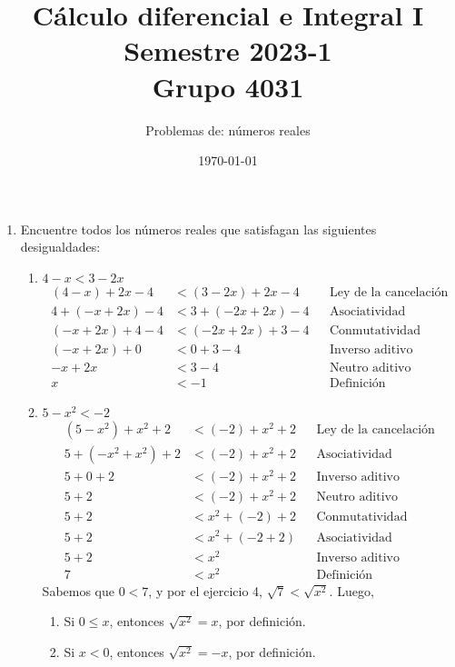 \documentclass[11pt]{article}
\begin{document}
\title{\vspace{-2cm}Cálculo diferencial e Integral I \\ Semestre 2023-1 \\ Grupo 4031}
\author{Problemas de: números reales \\ }
\date{\today}
\maketitle
\thispagestyle{empty}

\begin{enumerate}
 \item Encuentre todos los números reales que satisfagan las siguientes desigualdades: \begin{enumerate}[label=(\alph*)]
  \item $4-x<3-2x$
  \begin{align*}
   (4-x)+2x-4&< (3-2x)+2x-4 && \text{Ley de la cancelación}\\
   4+(-x+2x)-4 &< 3+(-2x+2x)-4 && \text{Asociatividad}\\
   (-x+2x)+4-4 &< (-2x+2x)+3-4 && \text{Conmutatividad}\\
   (-x+2x)+0 &< 0+3-4 && \text{Inverso aditivo}\\
   -x+2x &< 3-4 && \text{Neutro aditivo}\\
   x &< -1 && \text{Definición}
  \end{align*}

 \item $5-x^2<-2$
 \begin{align*}
  (5-x^2)+x^2+2 &< (-2)+x^2+2 && \text{Ley de la cancelación}\\
  5+(-x^2+x^2)+2 &< (-2)+x^2+2 && \text{Asociatividad}\\
  5+0+2 &< (-2)+x^2+2 && \text{Inverso aditivo}\\
  5+2 &< (-2)+x^2+2 && \text{Neutro aditivo}\\
  5+2 &< x^2+(-2)+2 && \text{Conmutatividad}\\
  5+2 &< x^2 + (-2+2) &&\text{Asociatividad}\\
  5+2 &< x^2&&\text{Inverso aditivo}\\
  7 &< x^2 && \text{Definición}
 \end{align*}
Sabemos que $0<7$, y por el ejercicio 4, $\sqrt{7}<\sqrt{x^2}$. Luego, \begin{enumerate}[label=\roman*)]
 \item Si $0\leq x$, entonces $\sqrt{x^2}=x$, por definición.
 \item Si $x<0$, entonces $\sqrt{x^2}=-x$, por definición.
\end{enumerate}
 \end{enumerate}


\end{enumerate}
\end{document}
